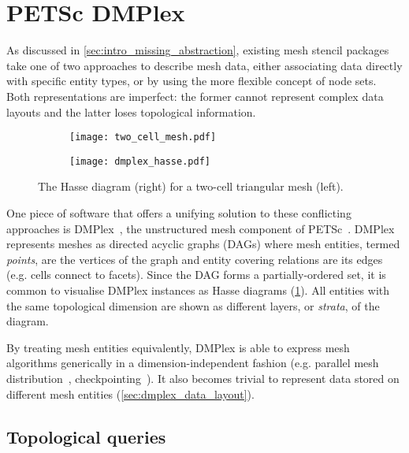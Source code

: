 \documentclass[thesis]{subfiles}
\begin{document}
\section{PETSc DMPlex}
\label{sec:foundations_dmplex}

As discussed in \cref{sec:intro_missing_abstraction}, existing mesh stencil packages take one of two approaches to describe mesh data, either associating data directly with specific entity types, or by using the more flexible concept of node sets.
Both representations are imperfect: the former cannot represent complex data layouts and the latter loses topological information.

\begin{figure}
  \centering
  \begin{subfigure}{.49\textwidth}
    \centering
    \texttt{[image: two\_cell\_mesh.pdf]}
  \end{subfigure}
  \begin{subfigure}{.49\textwidth}
    \centering
    \texttt{[image: dmplex\_hasse.pdf]}
  \end{subfigure}
  \caption{
    The Hasse diagram (right) for a two-cell triangular mesh (left).
  }
  \label{fig:dmplex_hasse}
\end{figure}

One piece of software that offers a unifying solution to these conflicting approaches is DMPlex~\cite{knepleysieve2009,knepleyUnstructuredOverlappingMesh2015,langeEfficientMeshManagement2016}, the unstructured mesh component of PETSc~\cite{petsc-efficient,petsc-user-ref,petsc-web-page}.
DMPlex represents meshes as directed acyclic graphs (DAGs) where mesh entities, termed \emph{points}, are the vertices of the graph and entity covering relations are its edges (e.g. cells connect to facets).
Since the DAG forms a partially-ordered set, it is common to visualise DMPlex instances as Hasse diagrams (\cref{fig:dmplex_hasse}).
All entities with the same topological dimension are shown as different layers, or \emph{strata}, of the diagram.

By treating mesh entities equivalently, DMPlex is able to express mesh algorithms generically in a dimension-independent fashion (e.g. parallel mesh distribution~\cite{knepleyUnstructuredOverlappingMesh2015}, checkpointing~\cite{doi:10.1137/23M1613724}).
It also becomes trivial to represent data stored on different mesh entities (\cref{sec:dmplex_data_layout}).

\subsection{Topological queries}
\label{sec:dmplex_queries}
\end{document}
